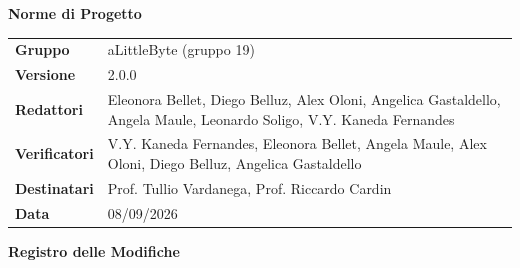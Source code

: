 \documentclass[a4paper,12pt]{article}
\begin{document}
\thispagestyle{firstpage}

\vspace*{0.5cm}

\begin{center}
    {\LARGE \textbf{Norme di Progetto}}
\end{center}

\vspace{1.5cm}

\begin{center}
    \renewcommand{\arraystretch}{1.3}
    \begin{tcolorbox}[
        width=0.92\textwidth,
        colback=gray!6,
        colframe=gray!45,
        boxrule=0.5pt,
        arc=2mm,
        boxsep=0pt,
        left=8pt, right=8pt, top=8pt, bottom=8pt
    ]
        \begin{tabularx}{\linewidth}{>{\bfseries}p{3.5cm} X}
            Gruppo      & aLittleByte (gruppo 19) \\
            Versione    & 2.0.0 \\
            Redattori   & Eleonora Bellet, Diego Belluz, Alex Oloni, Angelica Gastaldello, Angela Maule, Leonardo Soligo, V.Y. Kaneda Fernandes \\
            Verificatori& V.Y. Kaneda Fernandes, Eleonora Bellet, Angela Maule, Alex Oloni, Diego Belluz, Angelica Gastaldello \\
            Destinatari & Prof. Tullio Vardanega, Prof. Riccardo Cardin \\
            Data        & 08/09/2026 \\
        \end{tabularx}
    \end{tcolorbox}
\end{center}

\newpage


\begin{center}
    {\Large \textbf{Registro delle Modifiche}}
\end{center}

\vspace{0.35cm}
\end{document}
